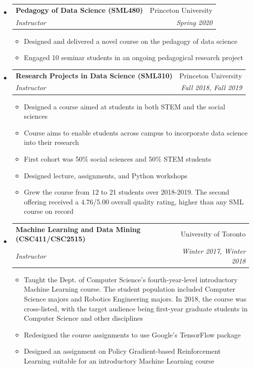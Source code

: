 \documentclass[letterpaper,11pt]{article}
\makeatletter
\newcommand{\resitem}[1]{\item #1 \vspace{-2pt}}
\newcommand{\ressubheading}[4]{
\begin{tabular*}{\linewidth}[t]{l@{\extracolsep{\fill}}r}
		\textbf{#1} & #2 \\
		\textit{\textcolor{accent}{#3}} & \textit{#4} \\
\end{tabular*}\vspace{-2pt}}
\makeatother
\begin{document}
\begin{itemize}
	\ressubheading{Introduction to Data Science (SML201)}{Princeton University}{Instructor}{Spring 2019, Spring 2020}
	\begin{itemize}
		\resitem{Redesigned the course to incorporate active learning during precepts (a.k.a. tutorials)}
		\resitem{Course rated as having the highest ``Overall quality'' of all introductory statistics offerings at Princeton since 2015 }
	\end{itemize}
\item
	\ressubheading{Pedagogy of Data Science (SML480)}{Princeton University}{Instructor}{Spring 2020}
	\begin{itemize}
		\resitem{Designed and delivered a novel course on the pedagogy of data science}
		\resitem{Engaged 10 seminar students in an ongoing pedagogical research project}
	\end{itemize}
\item	
	\ressubheading{Research Projects in Data Science (SML310)}{Princeton University}{Instructor}{Fall 2018, Fall 2019}
	\begin{itemize}
		\resitem{Designed a course aimed at students in both STEM and the social sciences}
		\resitem{Course aims to enable students across campus to incorporate data science into their research}
		\resitem{First cohort was 50\% social sciences and 50\% STEM students}
		\resitem{Designed lecture, assignments, and Python workshops}
		\resitem{Grew the course from 12 to 21 students over 2018-2019. The second offering received a 4.76/5.00 overall quality rating, higher than any SML course on record}
	\end{itemize}
\item
	\ressubheading{Machine Learning and Data Mining (CSC411/CSC2515)}{University of Toronto}{Instructor}{Winter 2017, Winter 2018}
	\begin{itemize}
		\resitem{Taught the Dept. of Computer Science's fourth-year-level introductory Machine Learning course. The student population included Computer Science majors and Robotics Engineering majors. In 2018, the course was cross-listed, with the target audience being first-year graduate students in Computer Science and other disciplines}
		\resitem{Redesigned the course assignments to use Google's TensorFlow package}
		\resitem{Designed an assignment on Policy Gradient-based Reinforcement Learning suitable for an introductory Machine Learning course}
	\end{itemize}


\end{itemize}
\end{document}

